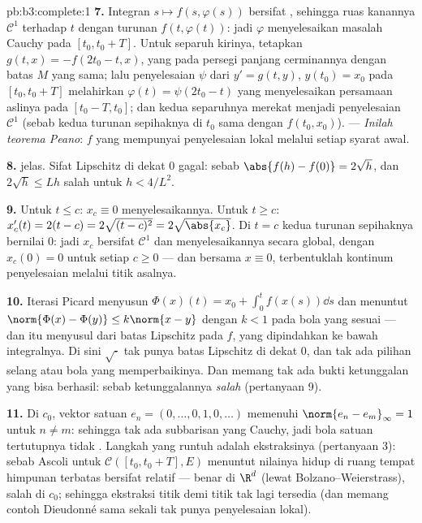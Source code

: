 \begin{solution}{pb:b3:complete:1}
\textbf{7.} Integran $s \mapsto f(s, \varphi(s))$ bersifat
, sehingga ruas kanannya $\mathcal C^1$ terhadap $t$ dengan
turunan $f(t, \varphi(t))$: jadi $\varphi$ menyelesaikan masalah
Cauchy pada $[t_0, t_0 + T]$. Untuk separuh kirinya, tetapkan $g(t, x) =
-f(2t_0 - t, x)$, yang  pada persegi panjang cerminannya dengan
batas $M$ yang sama; lalu penyelesaian $\psi$ dari $y' = g(t,y)$,
$y(t_0) = x_0$ pada $[t_0, t_0 + T]$ melahirkan $\varphi(t) =
\psi(2t_0 - t)$ yang menyelesaikan persamaan aslinya pada $[t_0 - T,
t_0]$; dan kedua separuhnya merekat menjadi penyelesaian $\mathcal C^1$ (sebab kedua
turunan sepihaknya di $t_0$ sama dengan $f(t_0, x_0)$). ---
\emph{Inilah teorema Peano}: $f$ yang  mempunyai penyelesaian
lokal melalui setiap syarat awal.

\textbf{8.}  jelas. Sifat Lipschitz di dekat $0$ gagal:
sebab $\abs{f(h) - f(0)} = 2\sqrt h$, dan $2\sqrt h \leq L h$
salah untuk $h < 4/L^2$.

\textbf{9.} Untuk $t \leq c$: $x_c \equiv 0$ menyelesaikannya. Untuk $t \geq
c$: $x_c'(t) = 2(t - c) = 2\sqrt{(t-c)^2} = 2\sqrt{\abs{x_c}}$.
Di $t = c$ kedua turunan sepihaknya bernilai $0$: jadi $x_c$ bersifat
$\mathcal C^1$ dan menyelesaikannya secara global, dengan $x_c(0) = 0$ untuk setiap
$c \geq 0$ --- dan bersama $x \equiv 0$, terbentuklah kontinum
penyelesaian melalui titik asalnya.

\textbf{10.} Iterasi Picard menyusun $\Phi(x)(t) = x_0 +
\int_0^t f(x(s))\dd s$ dan menuntut $\norm{\Phi(x) - \Phi(y)}
\leq k\norm{x - y}$ dengan $k < 1$ pada bola yang sesuai --- dan itu
menyusul dari batas Lipschitz pada $f$, yang dipindahkan ke bawah
integralnya. Di sini $\sqrt\cdot$ tak punya batas Lipschitz di dekat $0$,
dan tak ada pilihan selang atau bola yang memperbaikinya. Dan memang tak ada
bukti ketunggalan yang bisa berhasil: sebab ketunggalannya \emph{salah}
(pertanyaan 9).

\textbf{11.} Di $c_0$, vektor satuan $e_n = (0, \dots, 0, 1,
0, \dots)$ memenuhi $\norm{e_n - e_m}_\infty = 1$ untuk $n \neq
m$: sehingga tak ada subbarisan yang Cauchy, jadi bola satuan tertutupnya tidak
. Langkah yang runtuh adalah ekstraksinya (pertanyaan 3):
sebab Ascoli untuk $\mathcal C([t_0, t_0+T], E)$ menuntut nilainya
hidup di ruang tempat himpunan terbatas bersifat  relatif ---
benar di $\R^d$ (lewat Bolzano--Weierstrass), salah di $c_0$; sehingga ekstraksi
titik demi titik tak lagi tersedia (dan memang contoh Dieudonné
sama sekali tak punya penyelesaian lokal).


\end{solution}
